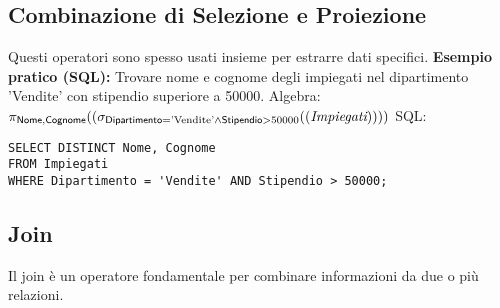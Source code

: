 	\subsection{Combinazione di Selezione e Proiezione}
	Questi operatori sono spesso usati insieme per estrarre dati specifici.
	\textbf{Esempio pratico (SQL):} Trovare nome e cognome degli impiegati nel dipartimento 'Vendite' con stipendio superiore a 50000.
	Algebra: $\pi_{\textsf{Nome}, \textsf{Cognome}}((\sigma_{\textsf{Dipartimento} = \text{'Vendite'} \wedge \textsf{Stipendio} > 50000}((\textit{Impiegati}))))$
	SQL:
	\begin{verbatim}
SELECT DISTINCT Nome, Cognome
FROM Impiegati
WHERE Dipartimento = 'Vendite' AND Stipendio > 50000;
	\end{verbatim}
	
	\subsection{Join}
	Il join è un operatore fondamentale per combinare informazioni da due o più relazioni.
